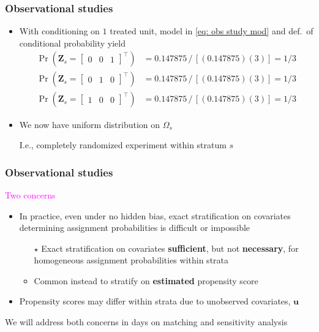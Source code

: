 \documentclass[table, xcolor = {dvipsnames}, 9pt]{beamer}
\theoremstyle{plain}
\begin{document}
\begin{frame}[t]
\frametitle{Observational studies}
\vfill
\begin{itemize} \vfill
\item With conditioning on $1$ treated unit, model in \eqref{eq: obs study mod} and def.~of conditional probability yield \vfill
\small
\begin{align*}
\Pr\left(\bm{Z}_s = \begin{bmatrix} 0 & 0 & 1 \end{bmatrix}^{\top}\right) & = 0.147875 \, / \, [(0.147875)(3)] = 1/3 \\
\Pr\left(\bm{Z}_s = \begin{bmatrix} 0 & 1 & 0 \end{bmatrix}^{\top}\right) & = 0.147875 \, / \, [(0.147875)(3)] = 1/3 \\
\Pr\left(\bm{Z}_s = \begin{bmatrix} 1 & 0 & 0 \end{bmatrix}^{\top}\right) & = 0.147875 \, / \, [(0.147875)(3)] = 1/3
\end{align*}
\normalsize \vfill
\item We now have uniform distribution on $\Omega_s$ \vfill 
\item[] I.e., completely randomized experiment within stratum $s$ \vfill
\end{itemize} \vfill
\end{frame}
\begin{frame}[t]
\frametitle{Observational studies}
\vfill
\textcolor{magenta}{Two concerns} \vfill
\begin{itemize} \vfill
\item In practice, even under no hidden bias, exact stratification on covariates determining assignment probabilities is difficult or impossible \vfill
\begin{itemize} \vfill
\item[$\star$] Exact stratification on covariates \textbf{sufficient}, but not \textbf{necessary}, for homogeneous assignment probabilities within strata \vfill
\item Common instead to stratify on \textbf{estimated} propensity score \vfill
\end{itemize} \vfill
\item Propensity scores may differ within strata due to unobserved covariates, $\bm{u}$ \vfill
\end{itemize} \vfill
We will address both concerns in days on matching and sensitivity analysis
\end{frame}
\end{document}
